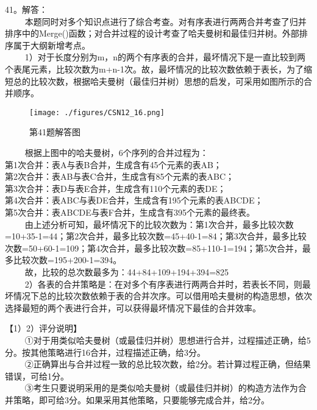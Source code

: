 41。解答：\\
$\qquad$ 本题同时对多个知识点进行了综合考查。对有序表进行两两合并考查了归并排序中的Merge()函数；对合并过程的设计考查了哈夫曼树和最佳归并树。外部排序属于大纲新增考点。\\
$\qquad$ 1）对于长度分别为m，n的两个有序表的合并，最坏情况下是一直比较到两个表尾元素，比较次数为m+n-1次。故，最坏情况的比较次数依赖于表长，为了缩短总的比较次数，根据哈夫曼树（最佳归并树）思想的启发，可采用如图所示的合并顺序。
\begin{figure}[ht]
\centering
\texttt{[image: ./figures/CSN12\_16.png]}
\caption{第41题解答图} \label{CSN12_fig16}
\end{figure}
$\qquad$ 根据上图中的哈夫曼树，6个序列的合并过程为：\\
第1次合并：表A与表B合并，生成含有45个元素的表AB；\\
第2次合并：表AB与表C合并，生成含有85个元素的表ABC；\\
第3次合并：表D与表E合并，生成含有110个元素的表DE；\\
第4次合并：表ABC与表DE合并，生成含有195个元素的表ABCDE；\\
第5次合并：表ABCDE与表F合并，生成含有395个元素的最终表。\\
$\qquad$ 由上述分析可知，最坏情况下的比较次数为：第1次合并，最多比较次数=10+35-1=44；第2次合并，最多比较次数=45+40-1=84；第3次合并，最多比较次数=50+60-1=109；第4次合并，最多比较次数=85+110-1=194；第5次合并，最多比较次数=195+200-1=394。\\
$\qquad$ 故，比较的总次数最多为：44+84+109+194+394=825 \\
$\qquad$ 2）各表的合并策略是：在对多个有序表进行两两合并时，若表长不同，则最坏情况下总的比较次数依赖于表的合并次序。可以借用哈夫曼树的构造思想，依次选择最短的两个表进行合并，可以获得最坏情况下最佳的合并效率。

【1）2）评分说明】\\
$\qquad$ ①对于用类似哈夫曼树（或最佳归并树）思想进行合并，过程描述正确，给5分。按其他策略进行16合并，过程描述正确，给3分。\\
$\qquad$ ②正确算出与合并过程一致的总比较次数，给2分。若计算过程正确，但结果错误，可给1分。\\
$\qquad$ ③考生只要说明采用的是类似哈夫曼树（或最佳归并树）的构造方法作为合并策略，即可给3分。如果采用其他策略，只要能够完成合并，给2分。

